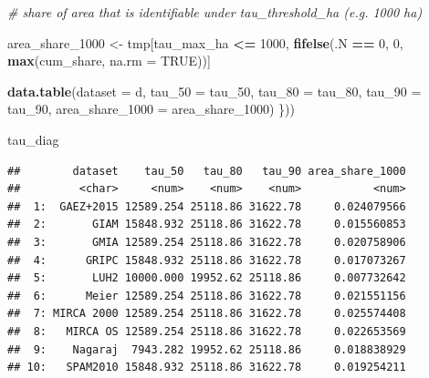 \documentclass[
  11pt,
]{article}
\newenvironment{Shaded}{\begin{snugshade}}{\end{snugshade}}
\newcommand{\AttributeTok}[1]{\textcolor[rgb]{0.13,0.29,0.53}{#1}}
\newcommand{\CommentTok}[1]{\textcolor[rgb]{0.56,0.35,0.01}{\textit{#1}}}
\newcommand{\ConstantTok}[1]{\textcolor[rgb]{0.56,0.35,0.01}{#1}}
\newcommand{\DecValTok}[1]{\textcolor[rgb]{0.00,0.00,0.81}{#1}}
\newcommand{\FunctionTok}[1]{\textcolor[rgb]{0.13,0.29,0.53}{\textbf{#1}}}
\newcommand{\NormalTok}[1]{#1}
\newcommand{\OtherTok}[1]{\textcolor[rgb]{0.56,0.35,0.01}{#1}}
\newcommand{\SpecialCharTok}[1]{\textcolor[rgb]{0.81,0.36,0.00}{\textbf{#1}}}
\begin{document}
\begin{Shaded}
\begin{Highlighting}[]
\CommentTok{\# share of area that is identifiable under tau\_threshold\_ha (e.g. 1000 ha)}
  
\NormalTok{  area\_share\_1000 }\OtherTok{\textless{}{-}}\NormalTok{ tmp[tau\_max\_ha }\SpecialCharTok{\textless{}=} \DecValTok{1000}\NormalTok{, }\FunctionTok{fifelse}\NormalTok{(.N }\SpecialCharTok{==} \DecValTok{0}\NormalTok{, }\DecValTok{0}\NormalTok{, }
                                                     \FunctionTok{max}\NormalTok{(cum\_share, }\AttributeTok{na.rm =} \ConstantTok{TRUE}\NormalTok{))]}

  \FunctionTok{data.table}\NormalTok{(}\AttributeTok{dataset =}\NormalTok{ d,}
             \AttributeTok{tau\_50 =}\NormalTok{ tau\_50,}
             \AttributeTok{tau\_80 =}\NormalTok{ tau\_80,}
             \AttributeTok{tau\_90 =}\NormalTok{ tau\_90,}
             \AttributeTok{area\_share\_1000 =}\NormalTok{ area\_share\_1000)}
\NormalTok{\}))}

\NormalTok{tau\_diag}
\end{Highlighting}
\end{Shaded}

\begin{verbatim}
##        dataset    tau_50   tau_80   tau_90 area_share_1000
##         <char>     <num>    <num>    <num>           <num>
##  1:  GAEZ+2015 12589.254 25118.86 31622.78     0.024079566
##  2:       GIAM 15848.932 25118.86 31622.78     0.015560853
##  3:       GMIA 12589.254 25118.86 31622.78     0.020758906
##  4:      GRIPC 15848.932 25118.86 31622.78     0.017073267
##  5:       LUH2 10000.000 19952.62 25118.86     0.007732642
##  6:      Meier 12589.254 25118.86 31622.78     0.021551156
##  7: MIRCA 2000 12589.254 25118.86 31622.78     0.025574408
##  8:   MIRCA OS 12589.254 25118.86 31622.78     0.022653569
##  9:    Nagaraj  7943.282 19952.62 25118.86     0.018838929
## 10:   SPAM2010 15848.932 25118.86 31622.78     0.019254211
\end{verbatim}
\end{document}
